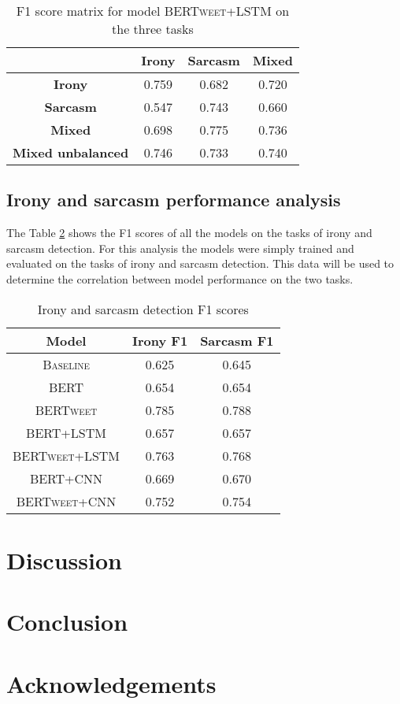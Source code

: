 \documentclass[10pt, a4paper]{article}
\begin{document}
\begin{table}[h!]
   \centering
   \begin{tabular}{|c|c|c|c|}
       \hline
       & \textbf{Irony} & \textbf{Sarcasm} & \textbf{Mixed} \\ \hline
       \textbf{Irony} & 0.759 & 0.682 & 0.720 \\ \hline
       \textbf{Sarcasm} & 0.547 & 0.743 & 0.660 \\ \hline
       \textbf{Mixed} & 0.698 & 0.775 & 0.736 \\ \hline
       \textbf{Mixed unbalanced} & 0.746 & 0.733 & 0.740\\ \hline
   \end{tabular}
   \caption{F1 score matrix for model \textsc{BERTweet+LSTM} on the three tasks}
   \label{tab:bertweet-bilstm-results}
\end{table}

\subsection{Irony and sarcasm performance analysis}\label{correlation}

The Table \ref{tab:correlation} shows the F1 scores of all the models on the tasks of irony and sarcasm detection.
For this analysis the models were simply trained and evaluated on the tasks of irony and sarcasm detection. 
This data will be used to determine the correlation between model performance on the two tasks.

\begin{table}[h!]
   \caption{Irony and sarcasm detection F1 scores}
   \label{tab:correlation}
   \begin{center}
   \begin{tabular}{|c|c|c|}
   \toprule
   Model & Irony F1 & Sarcasm F1 \\
   \midrule
   \textsc{Baseline} & 0.625 & 0.645 \\
   \textsc{BERT} & 0.654 & 0.654 \\
   \textsc{BERTweet} & 0.785 & 0.788 \\
   \textsc{BERT+LSTM} & 0.657 & 0.657 \\
   \textsc{BERTweet+LSTM} & 0.763 & 0.768 \\
   \textsc{BERT+CNN} & 0.669 & 0.670 \\
   \textsc{BERTweet+CNN} & 0.752 & 0.754 \\
   \bottomrule
   \end{tabular}
   \end{center}
\end{table}

\section{Discussion}

\section{Conclusion}

\section*{Acknowledgements}


 
\end{document}

